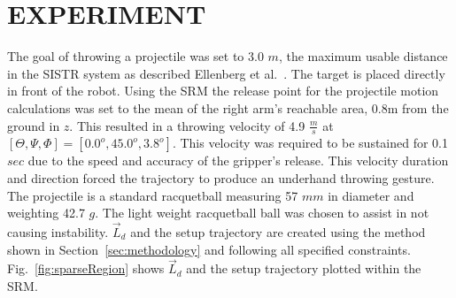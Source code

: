 \section{EXPERIMENT}\label{sec:exp}
The goal of throwing a projectile was set to 3.0 $m$, the maximum usable distance in the SISTR system as described Ellenberg et al.~\cite{5686325}.  The target is placed directly in front of the robot.  Using the SRM the release point for the projectile motion calculations was set to the mean of the right arm's reachable area, 0.8m from the ground in $z$.  This resulted in a throwing velocity of 4.9 $\frac{m}{s}$ at $[\Theta, \Psi, \Phi] =[0.0^o,45.0^o, 3.8^o]$.  This velocity was required to be sustained for 0.1 $sec$ due to the speed and accuracy of the gripper's release.  This velocity duration and direction forced the trajectory to produce an underhand throwing gesture.  The projectile is a standard racquetball measuring 57 $mm$ in diameter and weighting 42.7 $g$.  The light weight racquetball ball was chosen to assist in not causing instability.  $\vec{L}_d$ and the setup trajectory are created using the method shown in Section~\ref{sec:methodology} and following all specified constraints.  Fig.~\ref{fig:sparseRegion} shows $\vec{L}_d$ and the setup trajectory plotted within the SRM.



